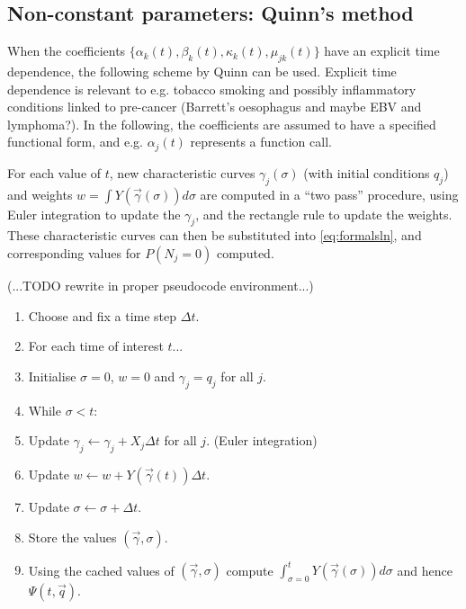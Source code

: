 \documentclass{article}
\begin{document}
\subsection*{Non-constant parameters: Quinn's method}
When the coefficients $\{\alpha_k(t), \beta_k(t), \kappa_k(t), \mu_{jk}(t)\}$
have an explicit time dependence, the following scheme by Quinn can be used\cite{quinn1989calculating}. Explicit time dependence is relevant to e.g. tobacco smoking
and possibly inflammatory conditions linked to pre-cancer (Barrett's oesophagus and maybe
EBV and lymphoma?). In the following, the coefficients are assumed to have a
specified functional form, and e.g. $\alpha_j(t)$ represents a function call.

For each value of $t$, new characteristic curves $\gamma_j(\sigma)$ (with initial
conditions $q_j$) and weights
$w = \int Y(\vec{\gamma}(\sigma)) d\sigma$ are computed in a ``two pass'' procedure, using Euler
integration to update the $\gamma_j$, and the rectangle rule to update the
weights. These
characteristic curves can then be substituted into \eqref{eq:formalsln}, and
corresponding values for $P(N_j = 0)$ computed.

(...TODO rewrite in proper pseudocode environment...)

\begin{enumerate}
    \item Choose and fix a time step $\Delta t$.
    \item For each time of interest $t$...
    \item Initialise $\sigma = 0$, $w = 0$ and $\gamma_j = q_j$ for all $j$.
    \item While $\sigma < t$:
    \item Update $\gamma_j \leftarrow \gamma_j + X_j \Delta t$ for all $j$.
    (Euler integration)
    \item Update $w \leftarrow w + Y(\vec{\gamma}(t)) \Delta t$.
    \item Update $\sigma \leftarrow \sigma + \Delta t$.
    \item Store the values $(\vec{\gamma}, \sigma)$.
    \item Using the cached values of $(\vec{\gamma}, \sigma)$ compute $\int_{\sigma=0}^t
    Y(\vec{\gamma}(\sigma)) d\sigma$ and hence $\Psi(t, \vec{q})$.
\end{enumerate}
\end{document}
